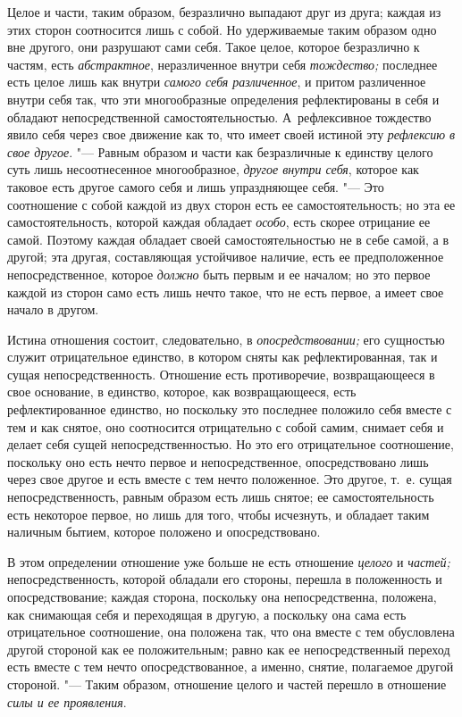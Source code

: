 Целое и части, таким образом, безразлично выпадают друг из друга; каждая из
этих сторон соотносится лишь с собой. Но удерживаемые таким образом одно
вне другого, они разрушают сами себя. Такое целое, которое безразлично к
частям, есть {\em абстрактное}, неразличенное внутри
себя {\em тождество;} последнее есть целое лишь как
внутри {\em самого себя различенное}, и притом
различенное внутри себя так, что эти многообразные определения
рефлектированы в себя и обладают непосредственной самостоятельностью.
А~рефлексивное тождество явило себя через свое движение как то, что имеет
своей истиной эту {\em рефлексию в свое другое}. "---
Равным образом и части как безразличные к единству целого суть лишь
несоотнесенное многообразное, {\em другое внутри себя},
которое как таковое есть другое самого себя и лишь упраздняющее себя. "--- Это
соотношение с собой каждой из двух сторон есть ее самостоятельность; но эта
ее самостоятельность, которой каждая обладает
{\em особо}, есть скорее отрицание ее самой. Поэтому
каждая обладает своей самостоятельностью не в себе самой, а в другой; эта
другая, составляющая устойчивое наличие, есть ее предположенное
непосредственное, которое {\em должно} быть первым и ее
началом; но это первое каждой из сторон само есть лишь нечто такое, что не
есть первое, а имеет свое начало в другом.

Истина отношения состоит, следовательно, в
{\em опосредствовании;} его сущностью служит
отрицательное единство, в котором сняты как рефлектированная, так и сущая
непосредственность. Отношение есть противоречие, возвращающееся в свое
основание, в единство, которое, как возвращающееся, есть рефлектированное
единство, но поскольку это последнее положило себя вместе с тем и как
снятое, оно соотносится отрицательно с собой самим, снимает себя и делает
себя сущей непосредственностью. Но это его отрицательное соотношение,
поскольку оно есть нечто первое и непосредственное, опосредствовано лишь
через свое другое и есть вместе с тем нечто положенное. Это другое, т.~е.
сущая непосредственность, равным образом есть лишь снятое; ее
самостоятельность есть некоторое первое, но лишь для того, чтобы исчезнуть,
и обладает таким наличным бытием, которое положено и опосредствовано.

В этом определении отношение уже больше не есть отношение
{\em целого} и {\em частей;}
непосредственность, которой обладали его стороны, перешла в положенность и
опосредствование; каждая сторона, поскольку она непосредственна, положена,
как снимающая себя и переходящая в другую, а поскольку она сама есть
отрицательное соотношение, она положена так, что она вместе с тем
обусловлена другой стороной как ее положительным; равно как ее
непосредственный переход есть вместе с тем нечто опосредствованное, а
именно, снятие, полагаемое другой стороной. "--- Таким образом, отношение
целого и частей перешло в отношение {\em силы и ее проявления}.

